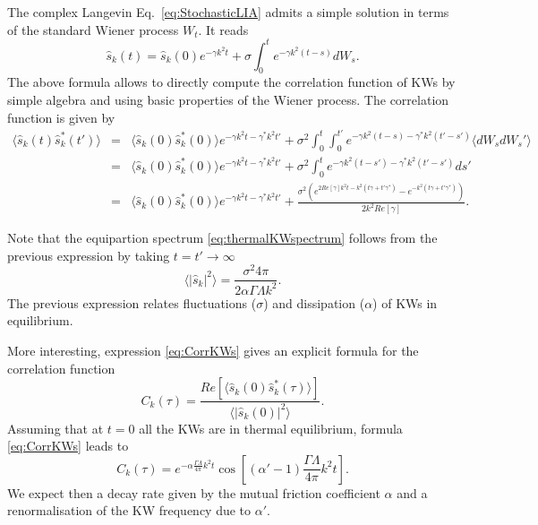\documentclass[sn-mathphys]{sn-jnl}%
\def\sk{\hat{s}_k}
\begin{document}
The complex Langevin Eq.~\eqref{eq:StochasticLIA} admits a simple solution in terms of the standard Wiener process $W_t$. It reads 
\begin{equation}
    \sk(t)=\sk(0)e^{-\gamma k^2 t}+\sigma \int_0^t e^{-\gamma k^2(t-s)}dW_s.
\end{equation}
The above formula allows to directly compute the correlation function of KWs by simple algebra and using basic properties of the Wiener process. The correlation function is given by
\begin{eqnarray}\label{eq:CorrKWs}
 \nonumber   \langle \sk(t)\sk^*(t')\rangle&=& \langle \sk(0)\sk^*(0)\rangle e^{-\gamma k^2t-\gamma^*k^2t'}+\sigma^2\int_0^t\int_0^{t'}e^{-\gamma k^2(t-s)-\gamma^*k^2(t'-s')}\langle dW_sdW_s'\rangle\\
    &=& \langle \sk(0)\sk^*(0)\rangle e^{-\gamma k^2t-\gamma^*k^2t'}+\sigma^2\int_0^te^{-\gamma k^2(t-s')-\gamma^*k^2(t'-s')}ds'\\
  \nonumber  &=& \langle \sk(0)\sk^*(0)\rangle e^{-\gamma k^2t-\gamma^*k^2t'}+\frac{\sigma^2 \left(e^{2Re[\gamma]k^2t-k^2 (t\gamma+t'\gamma^*)}- e^{-k^2(t\gamma+t'\gamma^*)} \right)}{2k^2 Re[\gamma]}.
\end{eqnarray}

Note that the equipartion spectrum \eqref{eq:thermalKWspectrum} follows from the previous expression by taking $t=t'\to\infty$
\begin{equation}
    \langle \lvert\sk\lvert^2\rangle=\frac{\sigma^2 4\pi}{2\alpha \Gamma \Lambda k^2}.
\end{equation}
The previous expression relates fluctuations ($\sigma$) and dissipation ($\alpha$) of KWs in equilibrium.

More interesting, expression \eqref{eq:CorrKWs} gives an explicit formula for the correlation function
\begin{equation}\label{eq:defKWCorrFunction}
    C_k(\tau)=\frac{Re[ \langle \sk(0)\sk^*(\tau)\rangle]}{ \langle \lvert\sk(0)\lvert^2\rangle}.
\end{equation}
Assuming that at $t=0$ all the KWs are in thermal equilibrium, formula \eqref{eq:CorrKWs} leads to
\begin{equation}
    C_k(\tau)=e^{-\alpha \frac{\Gamma \Lambda}{4\pi} k^2t }\cos{\left[(\alpha'-1) \frac{\Gamma \Lambda}{4\pi} k^2t\right]}.
\end{equation}
We expect then a decay rate given by the mutual friction coefficient $\alpha$ and a renormalisation of the KW frequency due to $\alpha'$.
\end{document}
